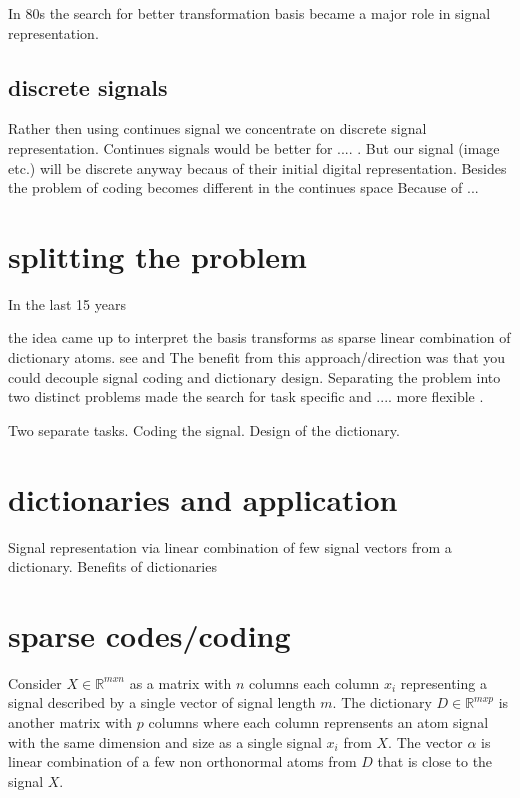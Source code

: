 In 80s the search for better transformation basis became a major role in signal representation. \cite{}

\subsection{discrete signals}
Rather then using continues signal we concentrate on discrete signal representation.
Continues signals would be better for .... . But our signal (image etc.) will be discrete anyway becaus of their initial digital representation. 
Besides the problem of coding becomes different in the continues space \cite{} Because of ...

\section{splitting the problem}
\cite{Rubinstein2010}
In the last 15 years 

the idea came up to interpret the basis transforms as sparse linear combination of dictionary atoms.
see \cite{Olshausen1997} and \cite{}
The benefit from this approach/direction was that you could decouple signal coding and dictionary design.
Separating the problem into two distinct problems made the search for task specific and .... more flexible \cite{?}.

Two separate tasks.
Coding the signal. Design of the dictionary.

\section{dictionaries and application}
Signal representation via linear combination of few signal vectors from a dictionary.
Benefits of dictionaries


\section{sparse codes/coding}


Consider $X \in \mathbb{R}^{mxn}$  as a matrix with $n$ columns each column $x_{i}$ representing a signal described by a single vector of signal length $m$.
The dictionary $D\in\mathbb{R}^{mxp}$ is another matrix with $p$ columns where each column reprensents an atom signal with the same dimension and size as a single signal $x_{i}$ from $X$.
The vector $\alpha$ is linear combination of a few non orthonormal atoms from $D$ that is close to the signal $X$.

